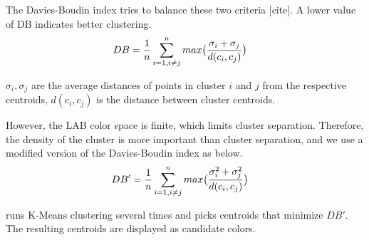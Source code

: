 The Davies-Boudin index tries to balance these two criteria [cite].  A lower value of DB indicates better clustering.
\begin{align}
DB &= \frac{1}{n} \sum_{i=1, i \neq j}^{n}max\big{(}\frac{\sigma_{i} + \sigma_{j}}{d(c_{i}, c_{j})}\big{)}
\end{align}

$\sigma_{i}, \sigma_{j}$ are the average distances of points in cluster $i$ and $j$ from the respective centroids, $d(c_{i}, c_{j})$ is the distance between cluster centroids.

However, the LAB color space is finite, which limits cluster separation. Therefore, the density of the cluster is more important than cluster separation, and we use a modified version of the Davies-Boudin index as below.
\begin{align}
DB' &= \frac{1}{n} \sum_{i=1, i \neq j}^{n}max\big{(}\frac{\sigma_{i}^{2} + \sigma_{j}^{2}}{d(c_{i}, c_{j})}\big{)}
\end{align}

\system runs K-Means clustering several times and picks centroids that minimize $DB'$. The resulting centroids are displayed as candidate colors.